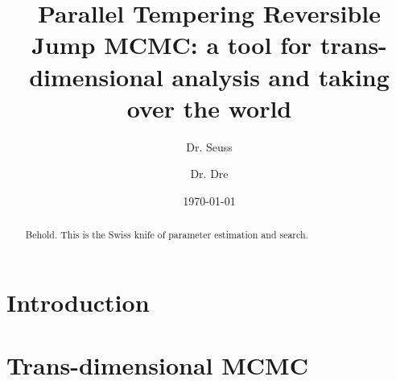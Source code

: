 \documentclass[reprint, amsmath,amssymb, aps, nofootinbib, superscriptaddress]{revtex4}
\begin{document}



\title{Parallel Tempering Reversible Jump MCMC: a tool for trans-dimensional analysis and taking over the world}%

 \author{Dr. Seuss}
 \author{Dr. Dre}

\date{\today}%



%
%
%
%
%
%
\begin{abstract}
Behold. This is the Swiss knife of parameter estimation and search.
\end{abstract}

\maketitle




%
%
%
%
%
%
\section{Introduction
\label{sec:intro}}




%
%
%
%
%
%
\section{Trans-dimensional MCMC\label{sec:rjmcmc}}
\end{document}
